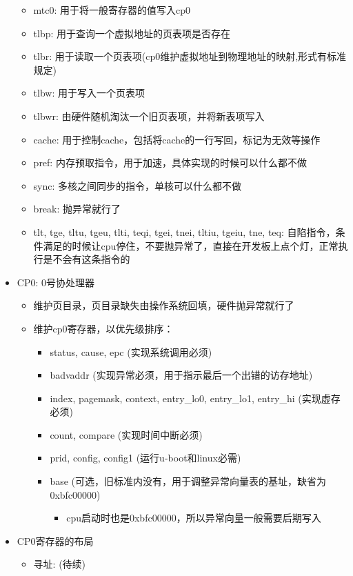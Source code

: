 \documentclass[lang=cn,11pt,a4paper]{elegantpaper}
\begin{document}
\begin{itemize}
\begin{itemize}
  \item mtc0: 用于将一般寄存器的值写入cp0
  \item tlbp: 用于查询一个虚拟地址的页表项是否存在
  \item tlbr: 用于读取一个页表项(cp0维护虚拟地址到物理地址的映射,形式有标准规定)
  \item tlbw: 用于写入一个页表项
  \item tlbwr: 由硬件随机淘汰一个旧页表项，并将新表项写入
  \item cache: 用于控制cache，包括将cache的一行写回，标记为无效等操作
  \item pref: 内存预取指令，用于加速，具体实现的时候可以什么都不做
  \item sync: 多核之间同步的指令，单核可以什么都不做
  \item break: 抛异常就行了
  \item tlt, tge, tltu, tgeu, tlti, teqi, tgei, tnei, tltiu, tgeiu, tne, teq: 自陷指令，条件满足的时候让cpu停住，不要抛异常了，直接在开发板上点个灯，正常执行是不会有这条指令的
  \end{itemize}
\item CP0: 0号协处理器
  \begin{itemize}
  \item 维护页目录，页目录缺失由操作系统回填，硬件抛异常就行了
  \item 维护cp0寄存器，以优先级排序：
    \begin{itemize}
    \item status, cause, epc (实现系统调用必须)
	\item badvaddr (实现异常必须，用于指示最后一个出错的访存地址)
	\item index, pagemask, context, entry\_lo0, entry\_lo1, entry\_hi (实现虚存必须)
	\item count, compare (实现时间中断必须)
	\item prid, config, config1 (运行u-boot和linux必需)
	\item base (可选，旧标准内没有，用于调整异常向量表的基址，缺省为0xbfc00000)
      \begin{itemize}
	  \item cpu启动时也是0xbfc00000，所以异常向量一般需要后期写入
      \end{itemize}
    \end{itemize}
  \end{itemize}
\item CP0寄存器的布局
  \begin{itemize}
  \item 寻址: (待续)
  \end{itemize}
\end{itemize}
\end{document}
